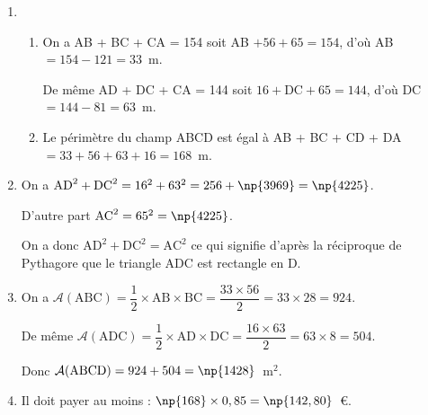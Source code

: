 \begin{enumerate}
\item 
	\begin{enumerate}
		\item %
On a AB + BC + CA = 154 soit AB $+ 56 + 65 = 154$, d'où AB $ = 154 - 121 = 33$~m.

De même AD + DC + CA = 144 soit $16 + \text{DC} + 65 = 144$, d'où DC $ = 144 - 81 = 63$~m. 
		\item %
Le périmètre du champ ABCD est égal à AB + BC + CD + DA $ = 33 + 56 + 63 + 16 = 168$~m.
	\end{enumerate}
\item %
On a $\text{AD}^2 + \text{DC}^2  = 16^2 + 63^2 = 256 + \np{3969} = \np{4225}$.

D'autre part $\text{AC}^2 = 65^2 = \np{4225}$.

On a donc $\text{AD}^2 + \text{DC}^2  = \text{AC}^2$ ce qui signifie d'après la réciproque de Pythagore que le triangle ADC est rectangle en D.

\item %
On a $\mathcal{A}(\text{ABC}) = \dfrac{1}{2} \times \text{AB} \times \text{BC} = \dfrac{33 \times 56}{2} = 33 \times 28 = 924$.

De même  $\mathcal{A}(\text{ADC}) = \dfrac{1}{2} \times \text{AD} \times \text{DC} = \dfrac{16 \times 63}{2} = 63 \times 8 = 504$.

Donc  $\mathcal{A}(\text{ABCD}) = 924 + 504 = \np{1428}$~m$^2$.
\item %

%
Il doit payer au moins :  $\np{168} \times 0,85 = \np{142,80}$~\euro.
\end{enumerate}

\bigskip

